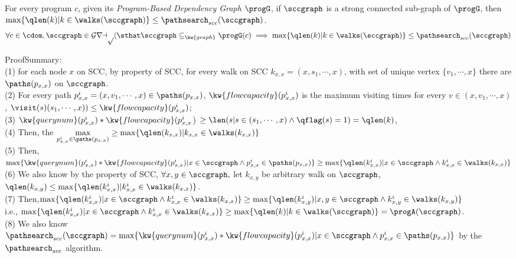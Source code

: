 \begin{lem}
  \label{lem:sound_adaptalg_scc}
  For every program $c$, given its \emph{Program-Based Dependency Graph} $\progG$, if $\sccgraph$ is a strong connected sub-graph of $\progG$, then
  $\max\{\qlen(k) | k \in \walks(\sccgraph)\} \leq \pathsearch_{scc}(\sccgraph) $.
  \[
    \forall c \in \cdom, \sccgraph \in \mathcal{Graph} \sthat  \sccgraph \subseteq_{\kw{graph}} \progG(c)
    \implies 
    \max\{\qlen(k) | k \in \walks(\sccgraph)\} \leq \pathsearch_{scc}(\sccgraph) 
    \]
\end{lem}

ProofSummary:
\\
(1) for each node $x$ on SCC, by property of SCC, 
for every walk on SCC $k_{x, x} = (x, s_1, \cdots, x)$,
with set of unique vertex $\{v_1, \cdots, x\}$
there are $\paths(p_{x,x})$ on $\sccgraph$.
\\
(2) For every path $p_{x,x}^{i} = (x, v_1, \cdots, x) \in \paths(p_{x,x})$,  
$\kw{flowcapacity} (p_{x,x}^{i})$ is the maximum visiting times for every $v \in (x, v_1, \cdots, x)$, 
$\visit(s) (s_1, \cdots, x)) \leq \kw{flowcapacity}(p_{x,x}^{i})$;
\\
(3) $\kw{querynum}(p_{x,x}^{i})  * \kw{flowcapacity}(p_{x,x}^{i}$)  $\geq\len(s | s \in ( s_1, \cdots, x) \land \qflag(s) = 1) =  \qlen(k)$,
\\
(4) Then, the $\max\limits_{p_{x,x}^{i} \in \paths(p_{x,x})} \geq \max\{\qlen(k_{x, x}) | k_{x, x} \in \walks(k_{x, x})\}$
\\
(5) Then,  $\max\{\kw{querynum}(p_{x,x}^{i})  * \kw{flowcapacity}(p_{x,x}^{i}) | x \in \sccgraph \land {p_{x,x}^{i} \in \paths(p_{x,x})} \} 
\geq \max\{\qlen(k_{x, x}^i) |x \in \sccgraph \land  k_{x, x}^i \in \walks(k_{x, x})\}$
\\
(6) We also know by the property of SCC, $\forall x, y \in \sccgraph, $ let $k_{x, y}$ be arbitrary walk on $\sccgraph$,
 $\qlen(k_{x, y}) \leq \max\{\qlen(k_{x, x}^i) | k_{x, x}^i \in \walks(k_{x, x})\}$.
\\
(7) Then,$ \max\{\qlen(k_{x, x}^i) |x \in \sccgraph \land  k_{x, x}^i \in \walks(k_{x, x})\} \geq  \max\{\qlen(k_{x, y}^i) |x, y \in \sccgraph \land  k_{x, y}^i \in \walks(k_{x, y})\}$
\\
i.e., 
$ \max\{\qlen(k_{x, x}^i) |x \in \sccgraph \land  k_{x, x}^i \in \walks(k_{x, x})\} \geq  \max\{\qlen(k) | k\in \walks(\sccgraph)\} = \progA(\sccgraph)$.
\\
(8) We also know 
$\pathsearch_{scc}(\sccgraph) = \max\{\kw{querynum}(p_{x,x}^{i})  * \kw{flowcapacity}(p_{x,x}^{i}) | x \in \sccgraph \land {p_{x,x}^{i} \in \paths(p_{x,x})} \} $ by the $\pathsearch_{scc}$ algorithm.
